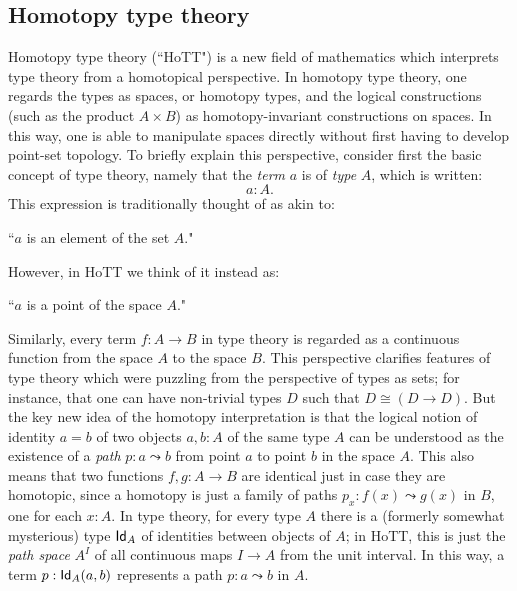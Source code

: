 {\subsection*{Homotopy type theory}

Homotopy type theory (``HoTT") is a new field of mathematics which interprets type theory from a homotopical perspective.
In homotopy type theory, one regards the types as spaces, or homotopy types, and the logical constructions (such as the product $A\times B$) as homotopy-invariant constructions on spaces.   In this way, one is able to manipulate spaces directly without first having to develop point-set topology.
To briefly explain this perspective, consider first the basic concept of type theory, namely that
the \emph{term} $a$ is of \emph{type} $A$, which is written:
$$
  a:A.
$$
This expression is traditionally thought of as akin to:
\begin{center}
``$a$ is an element of the set $A$."
\end{center}
However, in HoTT we think of it instead as:
\begin{center}
``$a$ is a point of the space $A$."
\end{center}
Similarly, every term $f : A\to B$ in type theory is regarded as a continuous function from the space $A$ to the space $B$. This perspective clarifies features of type theory which were puzzling from the perspective of types as sets; for instance, that one can have non-trivial types $D$ such that $D\cong (D\to D)$.  But the key new idea of the homotopy interpretation is that the logical notion of identity $a = b$ of two objects $a, b: A$ of the same type $A$ can be understood as the existence of a \emph{path} $p : a \leadsto b$ from point $a$ to point $b$ in the space $A$.  This also means that two functions $f, g: A\to B$ are identical just in case they are homotopic, since a homotopy is just a family of paths $p_x: f(x) \leadsto g(x)$ in $B$, one for each $x:A$.  In type theory, for every type $A$ there is a (formerly somewhat mysterious) type ${{\sf Id}}_{A}$ of identities between objects of $A$; in HoTT, this is just the \emph{path space} $A^I$ of all continuous maps $I\to A$ from the unit interval.  In this way, a term $p : {{\sf Id}}_{A}(a,b)$ represents a path $p : a \leadsto b$ in $A$. 

}
